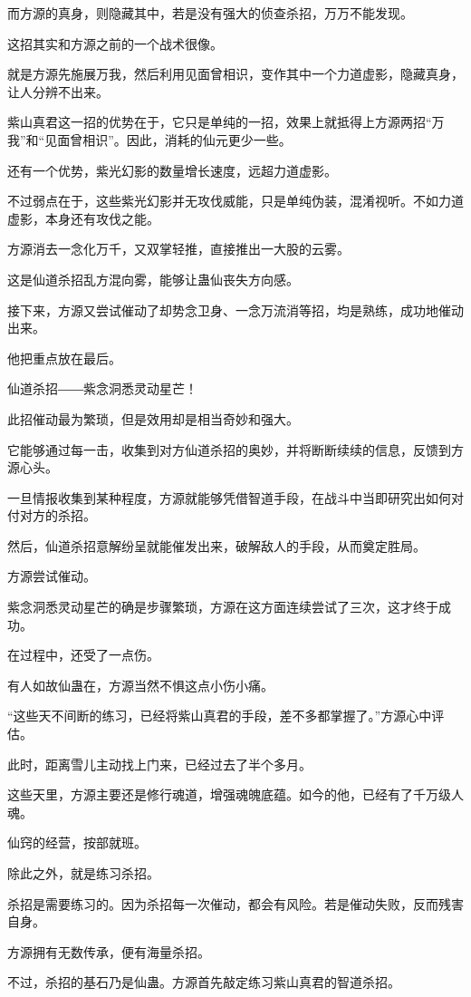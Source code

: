 \begin{this_body}
而方源的真身，则隐藏其中，若是没有强大的侦查杀招，万万不能发现。

这招其实和方源之前的一个战术很像。

就是方源先施展万我，然后利用见面曾相识，变作其中一个力道虚影，隐藏真身，让人分辨不出来。

紫山真君这一招的优势在于，它只是单纯的一招，效果上就抵得上方源两招“万我”和“见面曾相识”。因此，消耗的仙元更少一些。

还有一个优势，紫光幻影的数量增长速度，远超力道虚影。

不过弱点在于，这些紫光幻影并无攻伐威能，只是单纯伪装，混淆视听。不如力道虚影，本身还有攻伐之能。

方源消去一念化万千，又双掌轻推，直接推出一大股的云雾。

这是仙道杀招乱方混向雾，能够让蛊仙丧失方向感。

接下来，方源又尝试催动了却势念卫身、一念万流消等招，均是熟练，成功地催动出来。

他把重点放在最后。

仙道杀招――紫念洞悉灵动星芒！

此招催动最为繁琐，但是效用却是相当奇妙和强大。

它能够通过每一击，收集到对方仙道杀招的奥妙，并将断断续续的信息，反馈到方源心头。

一旦情报收集到某种程度，方源就能够凭借智道手段，在战斗中当即研究出如何对付对方的杀招。

然后，仙道杀招意解纷呈就能催发出来，破解敌人的手段，从而奠定胜局。

方源尝试催动。

紫念洞悉灵动星芒的确是步骤繁琐，方源在这方面连续尝试了三次，这才终于成功。

在过程中，还受了一点伤。

有人如故仙蛊在，方源当然不惧这点小伤小痛。

“这些天不间断的练习，已经将紫山真君的手段，差不多都掌握了。”方源心中评估。

此时，距离雪儿主动找上门来，已经过去了半个多月。

这些天里，方源主要还是修行魂道，增强魂魄底蕴。如今的他，已经有了千万级人魂。

仙窍的经营，按部就班。

除此之外，就是练习杀招。

杀招是需要练习的。因为杀招每一次催动，都会有风险。若是催动失败，反而残害自身。

方源拥有无数传承，便有海量杀招。

不过，杀招的基石乃是仙蛊。方源首先敲定练习紫山真君的智道杀招。


\end{this_body}
